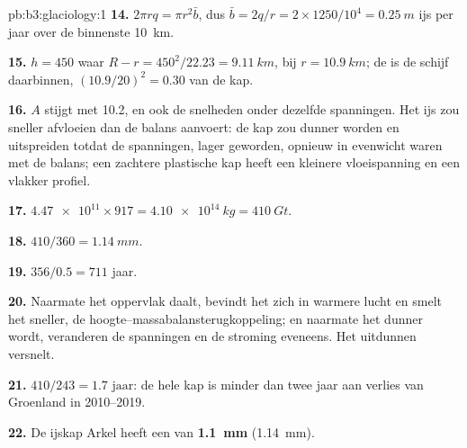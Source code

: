 \begin{solution}{pb:b3:glaciology:1}
\textbf{14.} $2\pi rq = \pi r^2\bar b$, dus $\bar b = 2q/r = 2\times1250/10^4
= \qty{0.25}{m}$ ijs per jaar over de binnenste \qty{10}{km}.

\textbf{15.} $h = 450$ waar $R - r = 450^2/22.23 = \qty{9.11}{km}$, bij
$r = \qty{10.9}{km}$; de  is de schijf daarbinnen, $(10.9/
20)^2 = 0.30$ van de kap.

\textbf{16.} $A$ stijgt met \num{10.2}, en ook de snelheden onder dezelfde
spanningen. Het ijs zou sneller afvloeien dan de balans aanvoert: de
kap zou dunner worden en uitspreiden totdat de spanningen, lager geworden,
opnieuw in evenwicht waren met de balans; een zachtere plastische kap heeft een kleinere vloeispanning en een vlakker
profiel.

\textbf{17.} $\num{4.47e11}\times917 = \qty{4.10e14}{kg} = \qty{410}{Gt}$.

\textbf{18.} $410/360 = \qty{1.14}{mm}$.

\textbf{19.} $356/0.5 = 711$ jaar.

\textbf{20.} Naarmate het oppervlak daalt, bevindt het zich in warmere lucht en smelt het sneller,
de hoogte--massabalansterugkoppeling; en naarmate het dunner wordt, veranderen de spanningen en de
stroming eveneens. Het uitdunnen versnelt.

\textbf{21.} $410/243 = \num{1.7}\text{ jaar}$: de hele kap is minder dan twee
jaar aan verlies van Groenland in 2010--2019.

\textbf{22.} De ijskap Arkel heeft een  van
\textbf{\qty[text-series-to-math=true]{1.1}{mm}} (\qty{1.14}{mm}).
\end{solution}

